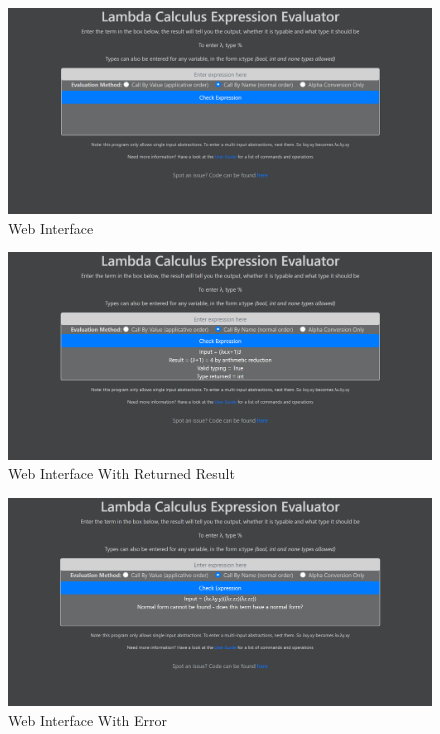 \documentclass[a4paper,11pt]{report}
\begin{document}
\begin{figure}[p]
	\includegraphics[scale=0.4]{images/web_interface_no_input}
	\centering
	\caption{Web Interface}
	\label{web_interface_no_input}
\end{figure}

\begin{figure}[p]
	\centering
	\includegraphics[scale=0.4]{images/web_interface_input}
	\caption{Web Interface With Returned Result}
	\label{web_interface_input}
\end{figure}

\begin{figure}[p]
	\centering
	\includegraphics[scale=0.4]{images/web_interface_error}
	\caption{Web Interface With Error}
	\label{web_interface_error}
\end{figure}
\end{document}
